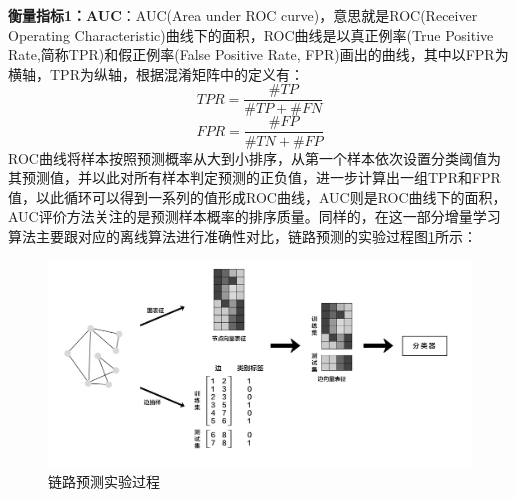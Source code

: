 \textbf{衡量指标1：AUC}：AUC(Area under ROC curve)，意思就是ROC(Receiver Operating Characteristic)曲线下的面积，ROC曲线是以真正例率(True Positive Rate,简称TPR)和假正例率(False Positive Rate, FPR)画出的曲线，其中以FPR为横轴，TPR为纵轴，根据混淆矩阵中的定义有：
\begin{equation}
	TPR = \frac{\#TP}{\#TP+\#FN}
\end{equation}
\begin{equation}
FPR = \frac{\#FP}{\#TN+\#FP}
\end{equation}
ROC曲线将样本按照预测概率从大到小排序，从第一个样本依次设置分类阈值为其预测值，并以此对所有样本判定预测的正负值，进一步计算出一组TPR和FPR值，以此循环可以得到一系列的值形成ROC曲线，AUC则是ROC曲线下的面积，AUC评价方法关注的是预测样本概率的排序质量。同样的，在这一部分增量学习算法主要跟对应的离线算法进行准确性对比，链路预测的实验过程图\ref{fig:link_prediction_process}所示：
\begin{figure}
	\centering
	\includegraphics[width=6in]{figures/link_predict_frame}
	\caption{链路预测实验过程}
	\label{fig:link_prediction_process}
\end{figure}

